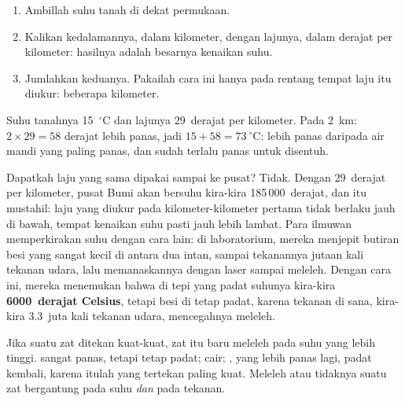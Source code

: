 \begin{method}\label{met:g6:inside-the-earth:temperature}
\begin{enumerate}
  \item Ambillah suhu tanah di dekat permukaan.
  \item Kalikan kedalamannya, dalam kilometer, dengan lajunya, dalam derajat
        per kilometer: hasilnya adalah besarnya kenaikan suhu.
  \item Jumlahkan keduanya. Pakailah cara ini hanya pada rentang tempat laju
        itu diukur: beberapa kilometer.
\end{enumerate}
\end{method}

\begin{example}\label{ex:g6:inside-the-earth:two-km}
Suhu tanahnya 15~$^\circ$C dan lajunya 29~derajat per kilometer. Pada 2~km:
$2 \times 29 = 58$ derajat lebih panas, jadi $15 + 58 = 73~^\circ$C: lebih
panas daripada air mandi yang paling panas, dan sudah terlalu panas untuk
disentuh.
\end{example}

Dapatkah laju yang sama dipakai sampai ke pusat? Tidak. Dengan 29~derajat
per kilometer, pusat Bumi akan bersuhu kira-kira 185\,000~derajat, dan itu
mustahil: laju yang diukur pada kilometer-kilometer pertama tidak berlaku
jauh di bawah, tempat kenaikan suhu pasti jauh lebih lambat. Para ilmuwan
memperkirakan suhu  dengan cara lain: di laboratorium, mereka menjepit
butiran besi yang sangat kecil di antara dua intan, sampai tekanannya
jutaan kali tekanan udara, lalu memanaskannya dengan laser sampai meleleh.
Dengan cara ini, mereka menemukan bahwa di tepi  yang padat
suhunya kira-kira \textbf{6000~derajat Celsius}, tetapi besi di 
tetap padat, karena tekanan di sana, kira-kira 3.3~juta kali tekanan udara,
mencegahnya meleleh.

\begin{remark}\label{rem:g6:inside-the-earth:pressure}
Jika suatu zat ditekan kuat-kuat, zat itu baru meleleh pada suhu yang lebih
tinggi.  sangat panas, tetapi tetap padat;  cair; , yang lebih panas lagi, padat kembali, karena  itulah yang
tertekan paling kuat. Meleleh atau tidaknya suatu zat bergantung pada suhu
\emph{dan} pada tekanan.
\end{remark}

